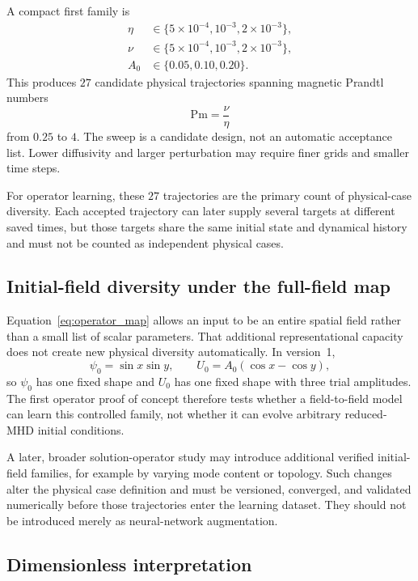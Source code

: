 \documentclass[11pt]{article}
\begin{document}
A compact first family is
\begin{align}
\eta&\in\{5\times10^{-4},10^{-3},2\times10^{-3}\},\\
\nu&\in\{5\times10^{-4},10^{-3},2\times10^{-3}\},\\
A_0&\in\{0.05,0.10,0.20\}.
\end{align}
This produces $27$ candidate physical trajectories spanning magnetic Prandtl numbers
\begin{equation}
\mathrm{Pm}=\frac{\nu}{\eta}
\end{equation}
from $0.25$ to $4$. The sweep is a candidate design, not an automatic acceptance list. Lower diffusivity and larger perturbation may require finer grids and smaller time steps.

For operator learning, these $27$ trajectories are the primary count of physical-case diversity. Each accepted trajectory can later supply several targets at different saved times, but those targets share the same initial state and dynamical history and must not be counted as independent physical cases.

\subsection{Initial-field diversity under the full-field map}

Equation~\eqref{eq:operator_map} allows an input to be an entire spatial field rather than a small list of scalar parameters. That additional representational capacity does not create new physical diversity automatically. In version~1,
\begin{equation}
\psi_0=\sin x\sin y,
\qquad
U_0=A_0(\cos x-\cos y),
\end{equation}
so $\psi_0$ has one fixed shape and $U_0$ has one fixed shape with three trial amplitudes. The first operator proof of concept therefore tests whether a field-to-field model can learn this controlled family, not whether it can evolve arbitrary reduced-MHD initial conditions.

A later, broader solution-operator study may introduce additional verified initial-field families, for example by varying mode content or topology. Such changes alter the physical case definition and must be versioned, converged, and validated numerically before those trajectories enter the learning dataset. They should not be introduced merely as neural-network augmentation.

\subsection{Dimensionless interpretation}
\end{document}
